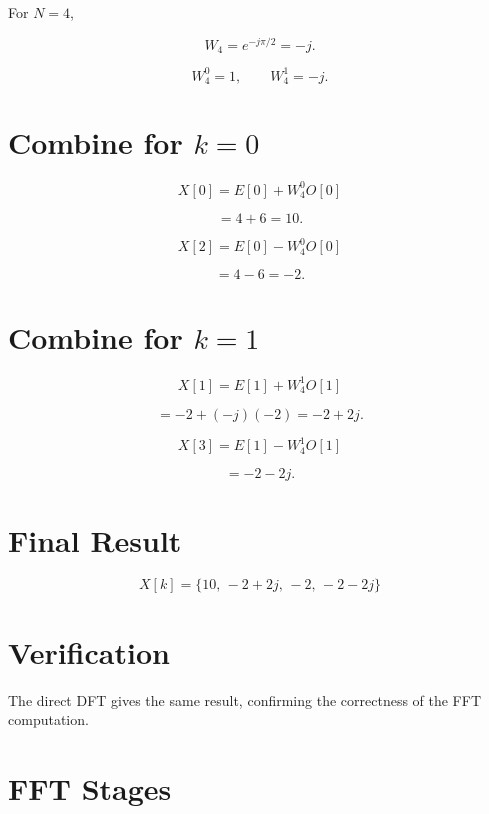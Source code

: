 For \(N=4\),

\[
W_4=e^{-j\pi/2}=-j.
\]

\[
W_4^0=1,
\qquad
W_4^1=-j.
\]


\section{Combine for \(k=0\)}

\[
X[0]=E[0]+W_4^0O[0]
\]

\[
=4+6=10.
\]

\[
X[2]=E[0]-W_4^0O[0]
\]

\[
=4-6=-2.
\]


\section{Combine for \(k=1\)}

\[
X[1]=E[1]+W_4^1O[1]
\]

\[
=-2+(-j)(-2)
=-2+2j.
\]

\[
X[3]=E[1]-W_4^1O[1]
\]

\[
=-2-2j.
\]


\section{Final Result}

\[
\boxed{
X[k]=
\{10,\,-2+2j,\,-2,\,-2-2j\}
}
\]


\section{Verification}

The direct DFT gives the same result, confirming the correctness of the FFT
computation.


\section{FFT Stages}

